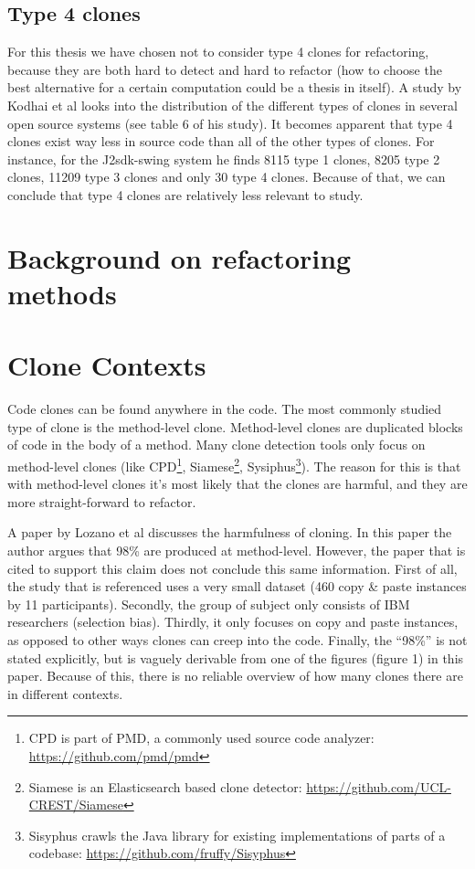 \subsection{Type 4 clones}
For this thesis we have chosen not to consider type 4 clones for refactoring, because they are both hard to detect and hard to refactor (how to choose the best alternative for a certain computation could be a thesis in itself). A study by Kodhai et al \cite{kodhai2013method} looks into the distribution of the different types of clones in several open source systems (see table 6 of his study). It becomes apparent that type 4 clones exist way less in source code than all of the other types of clones. For instance, for the J2sdk-swing system he finds  8115 type 1 clones, 8205 type 2 clones, 11209 type 3 clones and only 30 type 4 clones. Because of that, we can conclude that type 4 clones are relatively less relevant to study.

\section{Background on refactoring methods}

\section{Clone Contexts} %
Code clones can be found anywhere in the code. The most commonly studied type of clone is the method-level clone. Method-level clones are duplicated blocks of code in the body of a method. Many clone detection tools only focus on method-level clones (like CPD\footnote{CPD is part of PMD, a commonly used source code analyzer: \url{https://github.com/pmd/pmd}}, Siamese\footnote{Siamese is an Elasticsearch based clone detector: \url{https://github.com/UCL-CREST/Siamese}}, Sysiphus\footnote{Sisyphus crawls the Java library for existing implementations of parts of a codebase: \url{https://github.com/fruffy/Sisyphus}}). The reason for this is that with method-level clones it's most likely that the clones are harmful, and they are more straight-forward to refactor.

A paper by Lozano et al \cite{lozano2007evaluating} discusses the harmfulness of cloning. In this paper the author argues that 98\% are produced at method-level. However, the paper that is cited to support this claim \cite{bergman2004ethnographic} does not conclude this same information. First of all, the study that is referenced uses a very small dataset (460 copy \& paste instances by 11 participants). Secondly, the group of subject only consists of IBM researchers (selection bias). Thirdly, it only focuses on copy and paste instances, as opposed to other ways clones can creep into the code. Finally, the ``98\%'' is not stated explicitly, but is vaguely derivable from one of the figures (figure 1) in this paper. Because of this, there is no reliable overview of how many clones there are in different contexts.

